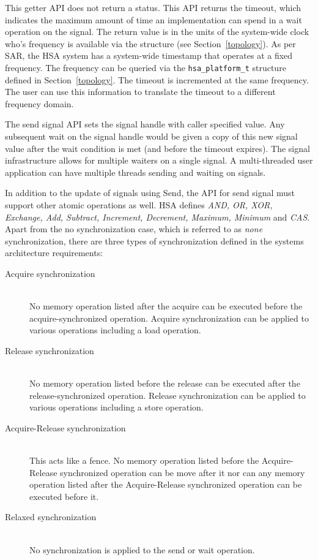 

This getter API does not return a status.  This API returns the
timeout, which indicates the maximum amount of time an
implementation can spend in a wait operation on the signal. The
return value is in the units of 
the system-wide clock who's frequency is available via the
 structure (see Section~\ref{topology}). As
per SAR, the HSA system has a system-wide timestamp that operates at
a fixed frequency. The frequency can be
queried via the \texttt{hsa\_platform\_t} structure defined in
Section~\ref{topology}. The timeout is incremented at the same
frequency.  The user can use this information to translate the
timeout to a different frequency domain. 

The send signal API sets the signal handle with caller specified
value. Any subsequent wait on the signal handle would be given 
a copy of this new signal value after the wait condition 
is met (and before the timeout expires).  The signal infrastructure
allows for multiple waiters on a single signal. A multi-threaded
user application can have multiple threads sending and waiting on
signals. 

In addition to the update of signals using
Send, the API for send signal must support other atomic operations as
well. HSA defines \emph {AND, OR, XOR, Exchange, Add, Subtract,
Increment, Decrement, Maximum, Minimum} and \emph{CAS}. Apart from
the no synchronization case, which is referred to as \emph{none}
synchronization, there are three types of synchronization defined in
the systems architecture requirements: 

\begin{description}
        \item[Acquire synchronization] \hfill \\ 
                No memory operation listed after the acquire can be
                executed before the acquire-synchronized operation. Acquire
                synchronization can be applied to various operations
                including a load operation.
        \item[Release synchronization] \hfill \\ 
                No memory operation listed before the release can be
                executed after the release-synchronized operation. Release
                synchronization can be applied to various operations
                including a store operation.
        \item[Acquire-Release synchronization] \hfill \\
                This acts like a fence. No memory operation listed
                before the Acquire-Release synchronized operation
                can be move after it nor can any memory operation
                listed after the Acquire-Release synchronized
                operation can be executed before it.
        \item[Relaxed synchronization] \hfill \\
                No synchronization is applied to the send or wait
                operation.
\end{description}
                
